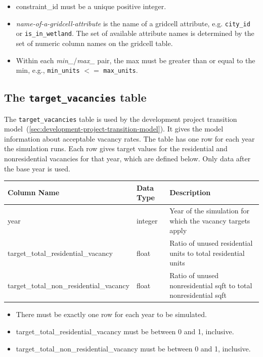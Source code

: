 \begin{itemize}
\tight
\item constraint_id must be a unique positive integer.

\item \emph{name-of-a-gridcell-attribute} is the name of a gridcell attribute,
e.g. \verb|city_id| or \verb|is_in_wetland|.  The set of available attribute
names is determined by the set of numeric column names on the gridcell table.

\item Within each \emph{min_}/\emph{max_} pair, the max must be greater than or
equal to the min, e.g., \verb|min_units| $<=$ \verb|max_units|.

\end{itemize}

\subsection{The {\tt target_vacancies} table}
\label{sec:table-target-vacancies}

The \verb|target_vacancies| table is used by the development project transition
model~(\ref{sec:development-project-transition-model}). It gives the model information about acceptable vacancy rates. The table
has one row for each year the simulation runs. Each row gives target values for
the residential and nonresidential vacancies for that year, which are defined
below.  Only data after the base year is used.

\begin{tabular}{|l|l|l|}

\hline
\textbf{Column Name} & \textbf{Data Type} & \textbf{Description} \\

\hline year & integer & Year of the simulation for which the vacancy
targets
apply  \\

\hline target_total_residential_vacancy & float & Ratio of unused residential
units to total residential units  \\

\hline target_total_non_residential_vacancy & float & Ratio of unused
nonresidential sqft to total nonresidential sqft  \\

\hline
\end{tabular}

\begin{itemize}
\tight
\item There must be exactly one row for each year to be simulated.
\item target_total_residential_vacancy must be between 0 and 1, inclusive.
\item target_total_non_residential_vacancy must be between 0 and 1, inclusive.
\end{itemize}


